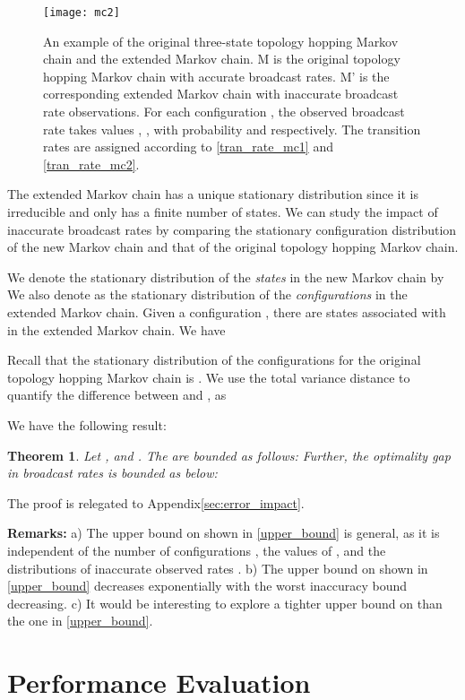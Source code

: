 \documentclass[10pt,conference]{IEEEtran}
\newtheorem{theorem}{\bf Theorem}
\begin{document}
\begin{figure}
\centering \texttt{[image: mc2]} \centering
\caption{An example of the original three-state topology hopping Markov chain and the extended Markov chain. M is the original topology
hopping Markov chain with accurate broadcast rates.
M' is the corresponding extended Markov chain with inaccurate broadcast
rate observations. For each configuration ,
the observed broadcast rate takes values , ,
 with probability  and 
respectively. The transition rates are assigned according to \eqref{tran_rate_mc1} and \eqref{tran_rate_mc2}.
}


\label{mc_inexact}
\end{figure}


The extended Markov chain has a unique stationary distribution since
it is irreducible and only has a finite number of states. We can study
the impact of inaccurate broadcast rates by comparing the stationary
configuration distribution of the new Markov chain and that
of the original topology hopping Markov chain.

We denote the stationary distribution of the \emph{states} in the
new Markov chain by 
We also denote 
as the stationary distribution of the \emph{configurations} in the
extended Markov chain. Given a configuration , there
are  states associated with  in the extended Markov
chain. We have 

Recall that the stationary distribution of the configurations for
the original topology hopping Markov chain is .
We use the total variance distance \cite{Diaconis91} to quantify
the difference between  and ,
as 

We have the following result: \begin{theorem} \label{error_impact}
Let , and .
The  are bounded
as follows: 
 Further, the optimality gap in broadcast rates  is bounded as below:

\end{theorem}
The proof is relegated to Appendix\ref{sec:error_impact}.

\textbf{Remarks:} a) The upper bound on
 shown in
\eqref{upper_bound} is general, as it is independent of the number
of configurations , the values of , and the
distributions of inaccurate observed rates
.
b) The upper bound on
 shown in
\eqref{upper_bound} decreases exponentially with the worst
inaccuracy bound  decreasing. c) It would be
interesting to explore a tighter upper bound on
 than the one in
\eqref{upper_bound}.

\section{Performance Evaluation}
\end{document}
